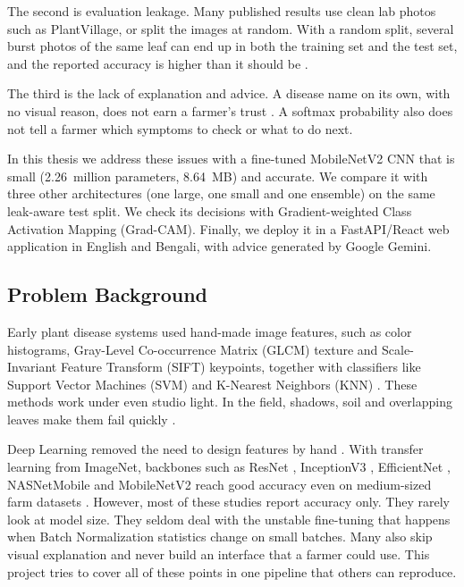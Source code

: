 The second is evaluation leakage. Many published results use clean lab photos such as PlantVillage, or split the images at random. With a random split, several burst photos of the same leaf can end up in both the training set and the test set, and the reported accuracy is higher than it should be \cite{mohanty2016using, shabrina2024novel}.

The third is the lack of explanation and advice. A disease name on its own, with no visual reason, does not earn a farmer's trust \cite{ryo2022explainable}. A softmax probability also does not tell a farmer which symptoms to check or what to do next.

In this thesis we address these issues with a fine-tuned MobileNetV2 CNN that is small (2.26~million parameters, 8.64~MB) and accurate. We compare it with three other architectures (one large, one small and one ensemble) on the same leak-aware test split. We check its decisions with Gradient-weighted Class Activation Mapping (Grad-CAM). Finally, we deploy it in a FastAPI/React web application in English and Bengali, with advice generated by Google Gemini.

\subsection{Problem Background}
Early plant disease systems used hand-made image features, such as color histograms, Gray-Level Co-occurrence Matrix (GLCM) texture and Scale-Invariant Feature Transform (SIFT) keypoints, together with classifiers like Support Vector Machines (SVM) and K-Nearest Neighbors (KNN) \cite{alhiary2011fast, pujari2016image, arivazhagan2013detection}. These methods work under even studio light. In the field, shadows, soil and overlapping leaves make them fail quickly \cite{ngugi2021recent}.

Deep Learning removed the need to design features by hand \cite{mohanty2016using, ferentinos2018deep}. With transfer learning from ImageNet, backbones such as ResNet \cite{he2016deep}, InceptionV3 \cite{szegedy2016rethinking}, EfficientNet \cite{tan2019efficientnet}, NASNetMobile \cite{zoph2018learning} and MobileNetV2 \cite{sandler2018mobilenetv2} reach good accuracy even on medium-sized farm datasets \cite{pan2010survey, too2019comparative}. However, most of these studies report accuracy only. They rarely look at model size. They seldom deal with the unstable fine-tuning that happens when Batch Normalization statistics change on small batches. Many also skip visual explanation \cite{selvaraju2017grad, amara2017deep} and never build an interface that a farmer could use. This project tries to cover all of these points in one pipeline that others can reproduce.

